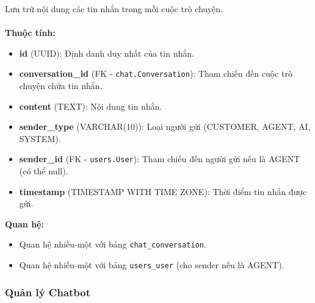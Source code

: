  Lưu trữ nội dung các tin nhắn trong mỗi cuộc trò chuyện. \\\\
\indent\textbf{Thuộc tính:}
\begin{itemize}
    \item \textbf{id} (UUID): Định danh duy nhất của tin nhắn.
    \item \textbf{conversation\_id} (FK - \texttt{chat.Conversation}): Tham chiếu đến cuộc trò chuyện chứa tin nhắn.
    \item \textbf{content} (TEXT): Nội dung tin nhắn.
    \item \textbf{sender\_type} (VARCHAR(10)): Loại người gửi (CUSTOMER, AGENT, AI, SYSTEM).
    \item \textbf{sender\_id} (FK - \texttt{users.User}): Tham chiếu đến người gửi nếu là AGENT (có thể null).
    \item \textbf{timestamp} (TIMESTAMP WITH TIME ZONE): Thời điểm tin nhắn được gửi.
\end{itemize}
\textbf{Quan hệ:}
\begin{itemize}
    \item Quan hệ nhiều-một với bảng \texttt{chat\_conversation}.
    \item Quan hệ nhiều-một với bảng \texttt{users\_user} (cho sender nếu là AGENT).
\end{itemize}

\subsubsection{Quản lý Chatbot}

